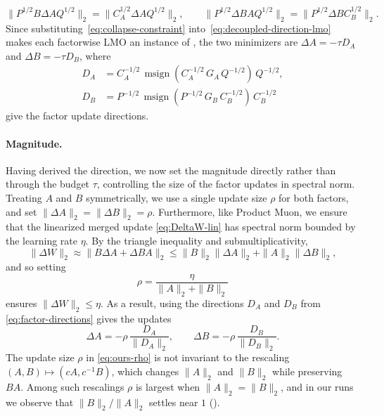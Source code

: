 \documentclass[11pt]{article}
\DeclareMathOperator{\msign}{msign}
\newcommand{\norm}[1]{\| #1\|}
\theoremstyle{plain}
\theoremstyle{definition}
\theoremstyle{remark}
\theoremstyle{definition}
\begin{document}
\begin{equation} \label{eq:collapse-constraint}
\norm{P^{1/2}B\Delta A Q^{1/2}}_2=\norm{C_A^{1/2}\Delta A Q^{1/2}}_2,
\qquad
\norm{P^{1/2}\Delta B A Q^{1/2}}_2=\norm{P^{1/2}\Delta B C_B^{1/2}}_2 .
\end{equation}
Since substituting~\eqref{eq:collapse-constraint} into~\eqref{eq:decoupled-direction-lmo} makes each factorwise LMO an instance of , the two minimizers are $\Delta A = -\tau D_A$ and $\Delta B = -\tau D_B$, where
\begin{equation}
  \begin{aligned}
  D_A &=
  C_A^{-1/2}\,
  \msign\!\left(C_A^{-1/2}\,G_A\,Q^{-1/2}\right)
  \,Q^{-1/2},\\
  D_B &=
  P^{-1/2}\,
  \msign\!\left(P^{-1/2}\,G_B\,C_B^{-1/2}\right)
  \,C_B^{-1/2}
  \end{aligned}
  \label{eq:factor-directions}
\end{equation}
give the factor update directions.

\paragraph{Magnitude.}
Having derived the direction, we now set the magnitude directly rather than through the budget $\tau$, controlling the size of the factor updates in spectral norm. Treating $A$ and $B$ symmetrically, we use a single update size $\rho$ for both factors, and set $\norm{\Delta A}_2=\norm{\Delta B}_2=\rho$. Furthermore, like Product Muon, we ensure that the linearized merged update \eqref{eq:DeltaW-lin} has spectral norm bounded by the learning rate $\eta$. By the triangle inequality and submultiplicativity,
\begin{equation}
\norm{\Delta W}_2
\approx
\norm{B\Delta A+\Delta B A}_2
\le
\norm{B}_2\norm{\Delta A}_2
+
\norm{A}_2\norm{\Delta B}_2,
\label{eq:ours-prodcap}
\end{equation}
and so setting
\begin{equation}
\rho = \frac{\eta}{\norm{A}_2+\norm{B}_2}
\label{eq:ours-rho}
\end{equation}
ensures $\norm{\Delta W}_2\leq \eta$. As a result, using the directions $D_A$ and $D_B$ from \eqref{eq:factor-directions} gives the updates
\begin{equation}
\Delta A = -\rho\,\frac{D_A}{\norm{D_A}_2},
\qquad
\Delta B = -\rho\,\frac{D_B}{\norm{D_B}_2}.
\label{eq:polora-update}
\end{equation}
The update size $\rho$ in \eqref{eq:ours-rho} is not invariant to the rescaling $(A,B)\mapsto(cA,c^{-1}B)$, which changes $\norm{A}_2$ and $\norm{B}_2$ while preserving $BA$. Among such rescalings $\rho$ is largest when $\norm{A}_2=\norm{B}_2$, and in our runs we observe that $\norm{B}_2/\norm{A}_2$ settles near $1$ ().
\end{document}
